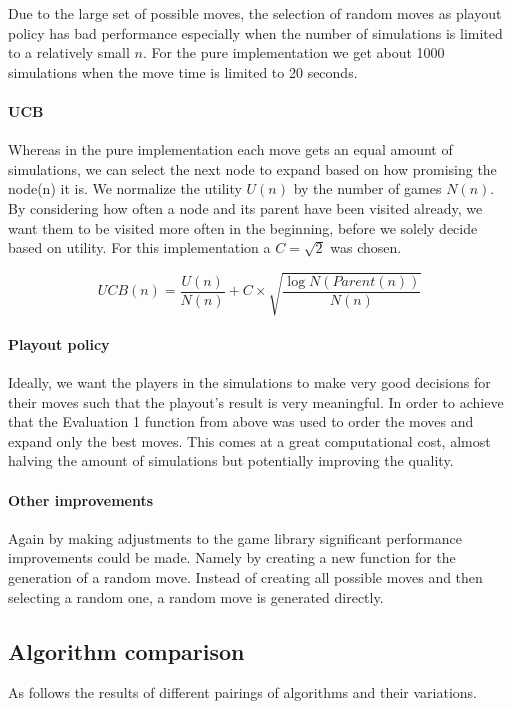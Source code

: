 \documentclass{llncs}
\begin{document}
Due to the large set of possible moves, the selection of random moves as playout policy has bad performance especially when the number of simulations is limited to a relatively small $n$. For the pure implementation we get about 1000 simulations when the move time is limited to 20 seconds.

\paragraph{UCB}
Whereas in the pure implementation each move gets an equal amount of simulations, we can select the next node to expand based on how promising the node(n) it is. We normalize the utility $U(n)$ by the number of games $N(n)$. By considering how often a node and its parent have been visited already, we want them to be visited more often in the beginning, before we solely decide based on utility. For this implementation a $ C = \sqrt{2}$ was chosen. \cite[p.327 ff]{russell_artificial_2021}

$$
	UCB(n) = \frac{U(n)}{N(n)} + C \times \sqrt{\frac{\log{N(Parent(n))}}{N(n)}}
$$

\paragraph{Playout policy}
Ideally, we want the players in the simulations to make very good decisions for their moves such that the playout's result is very meaningful. In order to achieve that the Evaluation 1 function from above was used to order the moves and expand only the best moves. This comes at a great computational cost, almost halving the amount of simulations but potentially improving the quality.

\paragraph{Other improvements}
Again by making adjustments to the game library significant performance improvements could be made. Namely by creating a new function for the generation of a random move. Instead of creating all possible moves and then selecting a random one, a random move is generated directly.

\subsection{Algorithm comparison}
As follows the results of different pairings of algorithms and their variations.
\end{document}
